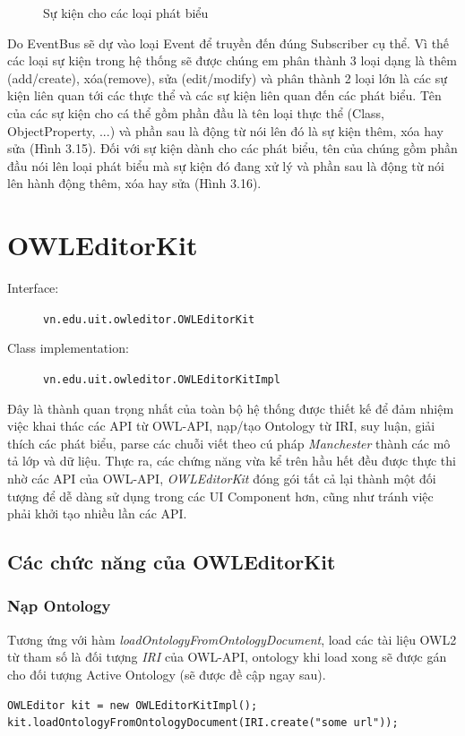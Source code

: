 {\begin{figure}[h!]
	\caption{Sự kiện cho các loại phát biểu \label{overflow}}
\end{figure}
Do EventBus sẽ dự vào loại Event để truyền đến đúng Subscriber cụ thể. Vì thế các loại sự kiện trong hệ thống sẽ được chúng em phân thành 3 loại dạng là thêm (add/create), xóa(remove), sửa (edit/modify) và phân thành 2 loại lớn là các sự kiện liên quan tới các thực thể và các sự kiện liên quan đến các phát biểu. Tên của các sự kiện cho cá thể gồm phần đầu là tên loại thực thể (Class, ObjectProperty, ...) và phần sau là động từ nói lên đó là sự kiện thêm, xóa hay sửa (Hình 3.15). Đối với sự kiện dành cho các phát biểu, tên của chúng gồm phần đầu nói lên loại phát biểu mà sự kiện đó đang xử lý và phần sau là động từ nói lên hành động thêm, xóa hay sửa (Hình 3.16).
\\
\section{OWLEditorKit}
\begin{description}
	\item[Interface:] \verb|vn.edu.uit.owleditor.OWLEditorKit|
	\item[Class implementation:] \verb|vn.edu.uit.owleditor.OWLEditorKitImpl|
\end{description}
Đây là thành quan trọng nhất của toàn bộ hệ thống được thiết kế để đảm nhiệm việc khai thác các API từ OWL-API, nạp/tạo Ontology từ IRI, suy luận, giải thích các phát biểu, parse các chuỗi viết theo cú pháp \textit{Manchester} thành các mô tả lớp và dữ liệu. Thực ra, các chứng năng vừa kể trên hầu hết đều được thực thi nhờ các API của OWL-API, \textit{OWLEditorKit} đóng gói tất cả lại thành một đối tượng để dễ dàng sử dụng trong các UI Component hơn, cũng như tránh việc phải khởi tạo nhiều lần các API. 
\subsection{Các chức năng của OWLEditorKit}

\subsubsection{Nạp Ontology}
Tương ứng với hàm \textit{loadOntologyFromOntologyDocument}, load các tài liệu OWL2 từ tham số là đối tượng \textit{IRI} của OWL-API, ontology khi load xong sẽ được gán cho đối tượng Active Ontology (sẽ được đề cập ngay sau).
\begin{verbatim}
OWLEditor kit = new OWLEditorKitImpl();
kit.loadOntologyFromOntologyDocument(IRI.create("some url"));
\end{verbatim}
}

